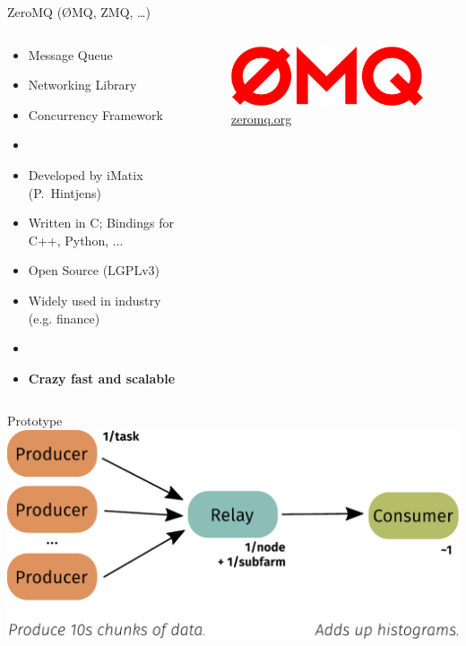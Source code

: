 \documentclass[aspectratio=1610,compress,titleprogressbar]{beamer}
\begin{document}
\begin{frame}{ZeroMQ (ØMQ, ZMQ, \dots)}
  \begin{columns}
    \begin{column}{.6\textwidth}
      \begin{itemize}
        \item Message Queue
        \item Networking Library
        \item Concurrency Framework
        \item [] {}
        \item Developed by iMatix (P.~Hintjens)
        \item Written in C; Bindings for C++, Python, ...
        \item Open Source (LGPLv3)
        \item Widely used in industry (e.g. finance)
        \item [] {}
        \item \textbf{Crazy fast and scalable}
      \end{itemize}
    \end{column}
    \begin{column}{.4\textwidth}
      \begin{figure}
        \centering
        \includegraphics[width=.8\textwidth]{graphics/zmq.png}
        \caption{\href{http://zeromq.org}{zeromq.org}}
      \end{figure}
    \end{column}
  \end{columns}
\end{frame}

\begin{frame}{Prototype}
  \includegraphics[width=\textwidth]{graphics/flow.pdf}
\end{frame}
\end{document}
